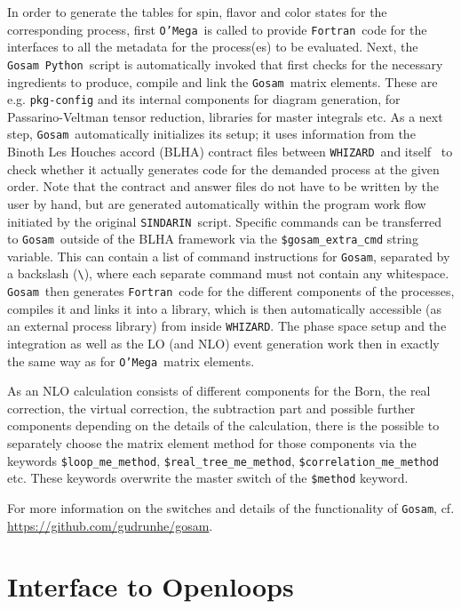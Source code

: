 \documentclass[12pt]{book}
\newcommand{\ttt}[1]{\texttt{#1}}
\newcommand{\whizard}{\ttt{WHIZARD}}
\newcommand{\oMega}{\ttt{O'Mega}}
\newcommand{\gosam}{\ttt{Gosam}}
\newcommand{\sindarin}{\ttt{SINDARIN}}
\newcommand{\fortran}{\ttt{Fortran}}
\newcommand{\python}{\ttt{Python}}
\begin{document}
In order to generate the tables for spin, flavor and color states for
the  corresponding process, first \oMega\ is called to provide
\fortran\ code for the interfaces to all the metadata for the
process(es) to be evaluated. Next, the \gosam\ \python\ script is
automatically invoked that first checks for the necessary ingredients
to produce, compile and link the \gosam\ matrix elements. These are
e.g. \ttt{pkg-config} and its internal components for diagram
generation, for Passarino-Veltman tensor reduction, libraries for
master integrals etc.  As a next step, \gosam\ automatically
initializes its setup; it uses information from 
the Binoth Les Houches accord (BLHA) contract files between \whizard\ and
itself~\cite{Binoth:2010xt,Alioli:2013nda} to check whether it
actually generates code for the demanded process at the given
order. Note that the contract and answer files do not have to be
written by the user by hand, but are generated automatically within
the program work flow initiated by the original
\sindarin\ script. Specific commands can be transferred to
\gosam\ outside of the BLHA framework via the
\ttt{\$gosam\_extra\_cmd} string variable. This can contain a list of
command instructions for \gosam, separated by a backslash (\ttt{\textbackslash}),
where each separate command must not contain any whitespace.
\gosam\ then generates \fortran\ code for the
different components of the processes, compiles it and links it into a
library, which is then automatically accessible (as an external
process library) from inside \whizard. The phase space setup and the
integration as well as the LO (and NLO) event generation work then in
exactly the same way as for \oMega\ matrix elements.

As an NLO calculation consists of different components for the Born,
the real correction, the virtual correction, the subtraction part and
possible further components depending on the details of the
calculation, there is the possible to separately choose the matrix
element method for those components via the keywords
\ttt{\$loop\_me\_method}, \ttt{\$real\_tree\_me\_method},
\ttt{\$correlation\_me\_method}  etc. These
keywords overwrite the master switch of the \ttt{\$method} keyword.

For more information on the switches and details of the functionality
of \gosam, cf. \url{https://github.com/gudrunhe/gosam}.


\section{Interface to Openloops}
\label{sec:openloops_me}
\end{document}
